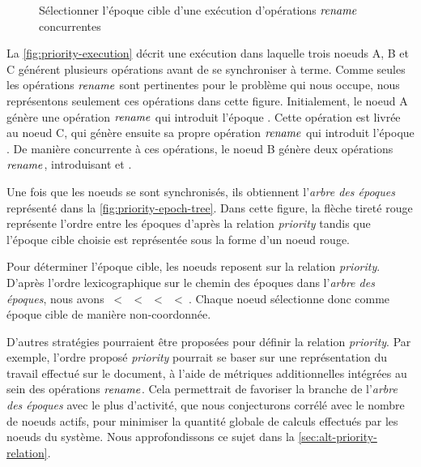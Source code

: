 \begin{figure}[!ht]
{\begin{minipage}{\linewidth}
          \label{fig:priority-epoch-tree}
      \end{minipage}}
  \caption{Sélectionner l'époque cible d'une exécution d'opérations $\mathit{rename}$ concurrentes}
  \label{fig:priority-example}
\end{figure}

La \autoref{fig:priority-execution} décrit une exécution dans laquelle trois noeuds A, B et C générent plusieurs opérations avant de se synchroniser à terme.
Comme seules les opérations $\mathit{rename}$ sont pertinentes pour le problème qui nous occupe, nous représentons seulement ces opérations dans cette figure.
Initialement, le noeud A génère une opération $\mathit{rename}$ qui introduit l'époque .
Cette opération est livrée au noeud C, qui génère ensuite sa propre opération $\mathit{rename}$ qui introduit l'époque .
De manière concurrente à ces opérations, le noeud B génère deux opérations $\mathit{rename}$, introduisant  et .

Une fois que les noeuds se sont synchronisés, ils obtiennent l'\emph{arbre des époques} représenté dans la \autoref{fig:priority-epoch-tree}.
Dans cette figure, la flèche tireté rouge représente l'ordre entre les époques d'après la relation \emph{priority} tandis que l'époque cible choisie est représentée sous la forme d'un noeud rouge.

Pour déterminer l'époque cible, les noeuds reposent sur la relation \emph{priority}.
D'après l'ordre lexicographique sur le chemin des époques dans l'\emph{arbre des époques}, nous avons ~<~~<~~<~~<~.
Chaque noeud sélectionne donc  comme époque cible de manière non-coordonnée.

D'autres stratégies pourraient être proposées pour définir la relation \emph{priority}.
Par exemple, l'ordre proposé \emph{priority} pourrait se baser sur une représentation du travail effectué sur le document, à l'aide de métriques additionnelles intégrées au sein des opérations $\mathit{rename}$.
Cela permettrait de favoriser la branche de l'\emph{arbre des époques} avec le plus d'activité, que nous conjecturons corrélé avec le nombre de noeuds actifs, pour minimiser la quantité globale de calculs effectués par les noeuds du système.
Nous approfondissons ce sujet dans la \autoref{sec:alt-priority-relation}.
